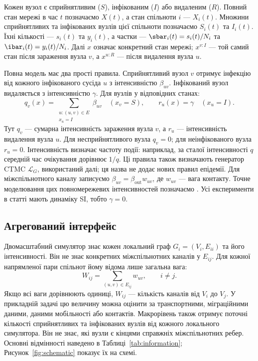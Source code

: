 Кожен вузол є сприйнятливим ($S$), інфікованим ($I$) або видаленим ($R$). Повний стан мережі в час $t$ позначаємо $X(t)$, а стан спільноти $i$ --- $X_i(t)$. Множини сприйнятливих та інфікованих вузлів цієї спільноти позначаємо $S_i(t)$ та $I_i(t)$. Їхні кількості --- $s_i(t)$ та $y_i(t)$, а частки --- $\sbar_i(t)=s_i(t)/N_i$ та $\ibar_i(t)=y_i(t)/N_i$. Далі $x$ означає конкретний стан мережі; $x^{v:I}$ --- той самий стан після зараження вузла $v$, а $x^{u:R}$ --- після видалення вузла $u$.

Повна модель має два прості правила. Сприйнятливий вузол $v$ отримує інфекцію від кожного інфікованого сусіда $u$ з інтенсивністю $\beta_{uv}$. Інфікований вузол видаляється з інтенсивністю $\gamma$. Для вузлів у відповідних станах:
\begin{equation}
\label{eq:full_generator}
q_v(x)=\sum_{\substack{u:(u,v)\in E\\x_u=I}}\beta_{uv}
\quad (x_v=S),
\qquad r_u(x)=\gamma\quad (x_u=I).
\end{equation}
Тут $q_v$ --- сумарна інтенсивність зараження вузла $v$, а $r_u$ --- інтенсивність видалення вузла $u$. Для несприйнятливого вузла $q_v=0$; для неінфікованого вузла $r_u=0$. Інтенсивність визначає частоту події: наприклад, за сталої інтенсивності $q$ середній час очікування дорівнює $1/q$. Ці правила також визначають генератор CTMC $\mathcal{L}_G$, використаний далі; ця назва не додає нових правил епідемії. Для міжспільнотного каналу записуємо $\beta_{uv}=\beta_{\mathrm{out}}w_{uv}$, де $w_{uv}$ --- вага контакту. Точне моделювання цих повномережевих інтенсивностей позначаємо \Full{}. Усі експерименти в статті мають динаміку SI, тобто $\gamma=0$.

\subsection{Агрегований інтерфейс}
\label{sec:interface}

Двомасштабний симулятор \TS{} знає кожен локальний граф $G_i=(V_i,E_{ii})$ та його інтенсивності. Він не знає конкретних міжспільнотних каналів у $E_{ij}$. Для кожної напрямленої пари спільнот йому відома лише загальна вага:
\begin{equation}
\label{eq:weight}
W_{ij}=\sum_{(u,v)\in E_{ij}}w_{uv},\qquad i\neq j.
\end{equation}
Якщо всі ваги дорівнюють одиниці, $W_{ij}$ --- кількість каналів від $V_i$ до $V_j$. У прикладній задачі цю величину можна оцінити за транспортними, міграційними даними, даними мобільності або контактів. Макрорівень також отримує поточні кількості сприйнятливих та інфікованих вузлів від кожного локального симулятора. Він не знає, які вузли є кінцями справжніх міжспільнотних ребер. Основні відмінності наведено в Таблиці~\ref{tab:information}; Рисунок~\ref{fig:schematic} показує їх на схемі.

